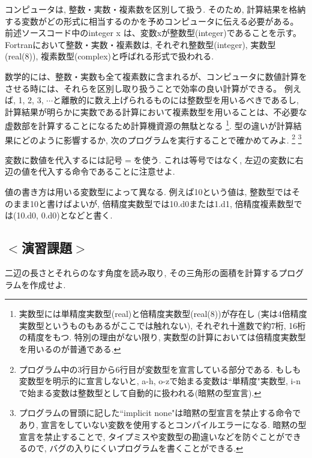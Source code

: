 コンピュータは, 整数・実数・複素数を区別して扱う.
そのため, 計算結果を格納する変数がどの形式に相当するのかを予めコンピュータに伝える必要がある。
前述ソースコード中の{\ttfamily integer x} は、変数{\ttfamily x}が整数型(integer)であることを示す。
Fortranにおいて整数・実数・複素数は, それぞれ整数型(integer), 実数型(real(8)), 複素数型(complex)と呼ばれる形式で扱われる.

数学的には、整数・実数も全て複素数に含まれるが、コンピュータに数値計算をさせる時には、それらを区別し取り扱うことで効率の良い計算ができる。
例えば, 1, 2, 3, $\cdots$と離散的に数え上げられるものには整数型を用いるべきであるし,
計算結果が明らかに実数である計算において複素数型を用いることは、不必要な虚数部を計算することになるため計算機資源の無駄となる
\footnote{実数型には単精度実数型(real)と倍精度実数型(real(8))が存在し
(実は4倍精度実数型というものもあるがここでは触れない),
それぞれ十進数で約7桁, 16桁の精度をもつ.
特別の理由がない限り, 実数型の計算においては倍精度実数型を用いるのが普通である.
}.
型の違いが計算結果にどのように影響するか, 次のプログラムを実行することで確かめてみよ.
\footnote{
  プログラム中の3行目から6行目が変数型を宣言している部分である.
  もしも変数型を明示的に宣言しないと, a-h, o-zで始まる変数は``単精度"実数型,
  i-nで始まる変数は整数型として自動的に扱われる(暗黙の型宣言).
}
\footnote{
  プログラムの冒頭に記した``implicit none"は暗黙の型宣言を禁止する命令であり,
  宣言をしていない変数を使用するとコンパイルエラーになる.
  暗黙の型宣言を禁止することで, タイプミスや変数型の勘違いなどを防ぐことができるので,
  バグの入りにくいプログラムを書くことができる.
}


変数に数値を代入するには記号$=$を使う.
これは等号ではなく, 左辺の変数に右辺の値を代入する命令であることに注意せよ.

値の書き方は用いる変数型によって異なる.
例えば10という値は, 整数型ではそのまま10と書けばよいが,
倍精度実数型では10.d0または1.d1, 倍精度複素数型では(10.d0, 0.d0)となどと書く. \\

\begin{comment}
Fortranは文字も変数として扱うことができる(文字型: character).
文字の長さはcharacter(len=5)などとして指定する.
次のプログラムは文字型を扱った例である.

\end{comment}


\subsection*{$<$演習課題$>$}
二辺の長さとそれらのなす角度を読み取り, その三角形の面積を計算するプログラムを作成せよ. \\

\begin{comment}
異なる型同士の演算は文法エラーではないが,
避けることが望ましい.
以下のプログラムは, 整数型, 実数型, 複素数型間の型変換の例である.

\end{comment}
